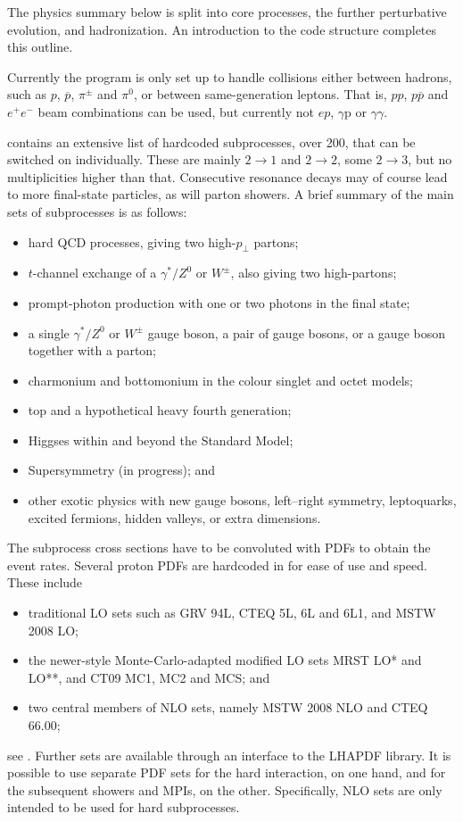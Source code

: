 The physics summary below is split into core processes, the further 
perturbative evolution, and hadronization. An introduction to the 
code structure completes this outline.  

\mcsubsection{\gensectionhard}

Currently the program is only set up to handle collisions either between 
hadrons, such as $p$, $\overline{p}$, $\pi^{\pm}$ and $\pi^0$, or between 
same-generation leptons. That is, $pp$, $p\overline{p}$ and $e^+e^-$ 
beam combinations can be used,  but currently not $ep$, 
$\gamma\mathrm{p}$ or $\gamma\gamma$.

\pythia contains an extensive list of hardcoded subprocesses, over 200, 
that can be switched on individually. These are mainly $2 \to 1$ and 
$2 \to 2$, some $2 \to 3$, but no multiplicities higher than that. 
Consecutive resonance decays may of course lead to more final-state 
particles, as will parton showers. A brief summary of the main sets 
of subprocesses is as follows:
\begin{itemize}
\item hard  QCD processes, giving two high-$p_{\perp}$ partons;
\item $t$-channel exchange of a $\gamma^*/Z^0$ or $W^{\pm}$, also giving
  two high-\pt partons;
\item prompt-photon production with one or two photons in the final state;
\item a single $\gamma^*/Z^0$ or $W^{\pm}$ gauge boson, a pair of gauge 
bosons, or a gauge boson together with a parton; 
\item charmonium and bottomonium in the colour singlet and octet models;
\item top and a hypothetical heavy fourth generation;
\item Higgses within and beyond the Standard Model;
\item Supersymmetry (in progress); and
\item other exotic physics with new gauge bosons, left--right symmetry,
leptoquarks, excited fermions, hidden valleys, or extra dimensions. 
\end{itemize}

The subprocess cross sections have to be convoluted with PDFs to obtain
the event rates. Several proton PDFs are hardcoded in \pythia for ease 
of use and speed. These include
\begin{itemize}
\item traditional LO sets such as GRV 94L, CTEQ 5L, 6L and 6L1, 
and MSTW 2008 LO; 
\item the newer-style Monte-Carlo-adapted modified LO sets MRST LO* and 
LO**, and CT09 MC1, MC2 and MCS; and 
\item two central members of NLO sets, namely MSTW 2008 NLO and
CTEQ 66.00; 
\end{itemize}
see .  
Further sets are available through an interface to the LHAPDF library.
It is possible to use separate PDF sets for the hard interaction, on one
hand, and for the subsequent showers and MPIs, on the other. Specifically, 
NLO sets are only intended to be used for hard subprocesses.

